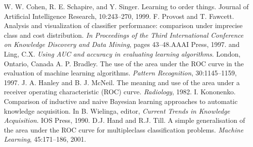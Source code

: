 \documentclass[twoside, twocolumn, 12pt]{article}
\begin{document}
\begin{thebibliography}{99}

W. W. Cohen, R. E. Schapire, and Y. Singer. Learning to order things. Journal of Artificial Intelligence Research, 10:243–270, 1999.
F. Provost and T. Fawcett. Analysis and visualization of classifier performance: comparison under imprecise class and cost distribution. \textit{In Proceedings of the Third International Conference on Knowledge Discovery and Data Mining}, pages 43–48.AAAI Press, 1997.
 and Ling, C.X. \textit{Using {AUC} and accuracy in evaluating learning algorithms}. London, Ontario, Canada
A. P. Bradley. The use of the area under the ROC curve in the evaluation of machine learning algorithms. \textit{Pattern Recognition}, 30:1145–1159, 1997.
J. A. Hanley and B. J. McNeil. The meaning and use of the area under a receiver operating characteristic (ROC) curve. \textit{Radiology}, 1982.
 I. Kononenko. Comparison of inductive and naive Bayesian learning approaches to automatic knowledge acquisition. In B. Wielinga, editor, \textit{Current Trends in Knowledge Acquisition}. IOS Press, 1990.
 D.J. Hand and R.J. Till. A simple generalisation of the area under the ROC curve for multipleclass classification problems. \textit{Machine Learning}, 45:171–186, 2001.

\end{thebibliography}
\end{document}

